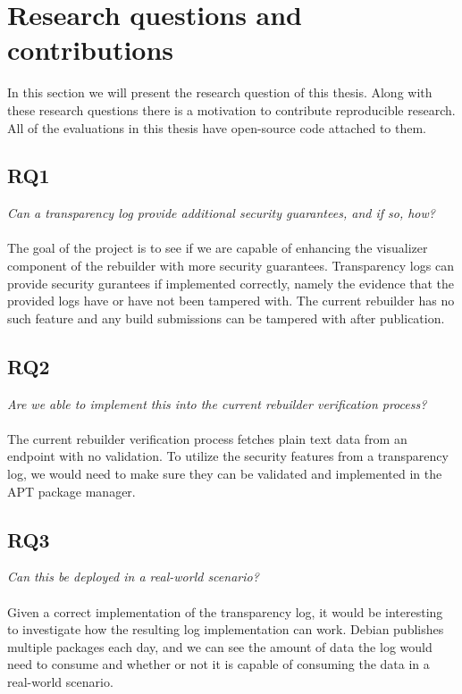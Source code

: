 \documentclass[../Main/thesis.tex]{subfiles}
\begin{document}
\section{Research questions and contributions}\label{sec:rq}
In this section we will present the research question of this thesis.  Along
with these research questions there is a motivation to contribute reproducible
research. All of the evaluations in this thesis have open-source code attached
to them.

\subsection*{RQ1}%
\label{sub:rq1}
\textit{Can a transparency log provide additional security guarantees, and if so, how?}
\\\\
The goal of the project is to see if we are capable of enhancing the visualizer
component of the rebuilder with more security guarantees. Transparency logs can
provide security gurantees if implemented correctly, namely the evidence that
the provided logs have or have not been tampered with. The current rebuilder
has no such feature and any build submissions can be tampered with after
publication.

\subsection*{RQ2}%
\label{sub:rq2}
\textit{Are we able to implement this into the current rebuilder verification process?}
\\\\
The current rebuilder verification process fetches plain text data from an
endpoint with no validation. To utilize the security features from a
transparency log, we would need to make sure they can be validated and
implemented in the APT package manager.

\subsection*{RQ3}%
\label{sub:rq3}
\textit{Can this be deployed in a real-world scenario?}
\\\\
Given a correct implementation of the transparency log, it would be interesting
to investigate how the resulting log implementation can work. Debian publishes
multiple packages each day, and we can see the amount of data the log would need
to consume and whether or not it is capable of consuming the data in a
real-world scenario.
\end{document}
